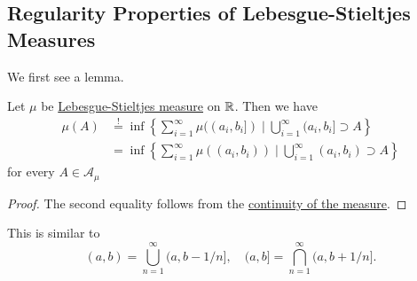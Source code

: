 \subsection{Regularity Properties of Lebesgue-Stieltjes Measures}
We first see a lemma.
\begin{lemma}
	Let \(\mu\) be \hyperref[def:Lebesgue-Stieltjes-measure]{Lebesgue-Stieltjes measure} on \(\mathbb{\MakeUppercase{r}} \). Then we have
	\[
		\begin{split}
			\mu (A) &\overset{\hyperref[prop:outer-measure]{!}}{=}\inf\left\{\sum\limits_{i=1}^{\infty} \mu ((a_{i}, b_{i}]) \mid \bigcup\limits_{i=1}^{\infty} (a_{i}, b_{i}]\supset A\right\}\\
			&= \inf\left\{\sum\limits_{i=1}^{\infty} \mu ((a_{i}, b_{i})) \mid \bigcup\limits_{i=1}^{\infty} (a_{i}, b_{i})\supset A\right\}
		\end{split}
	\]
	for every \(A\in \mathcal{A} _\mu \)
\end{lemma}
\begin{proof}
	The second equality follows from the \hyperref[thm:measure-space]{continuity of the measure}.
\end{proof}

\begin{remark}
	This is similar to
	\[
		(a, b) = \bigcup\limits_{n=1}^{\infty} (a, b - 1/n],\quad (a, b] = \bigcap\limits_{n=1}^{\infty} (a, b+1/n].
	\]
\end{remark}